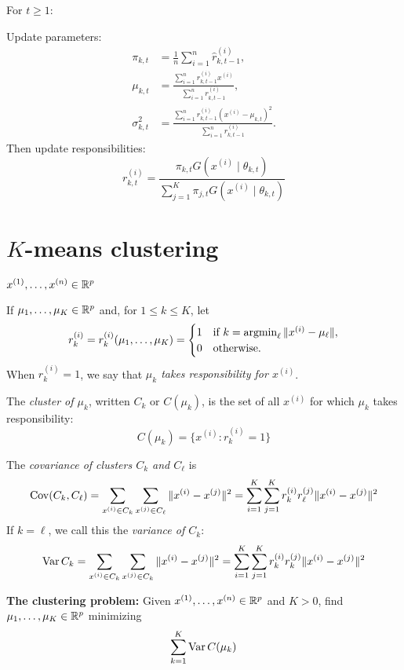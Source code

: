 \documentclass[12pt]{amsart}
\begin{document}
For $t\geq 1$:

Update parameters:
\begin{align*}
    \pi_{k, t} &= \frac1n\sum_{i=1}^n \hat r_{k,t-1}^{(i)},\\
    \mu_{k, t} &= \frac{\sum_{i=1}^n r^{(i)}_{k, t-1} x^{(i)}}{\sum_{i=1}^n r^{(i)}_{k,t-1}},\\
    \sigma_{k, t}^2 &= \frac{\sum_{i=1}^n r^{(i)}_{k, t-1}(x^{(i)}-\mu_{k,t})^2}{\sum_{i=1}^n r^{(i)}_{k, t-1}}.
\end{align*}
Then update responsibilities:
\[
    r_{k,t}^{(i)} = \frac{\pi_{k,t} G(x^{(i)} \mid \theta_{k, t})}{\sum_{j=1}^K \pi_{j,t} G(x^{(i)}\mid\theta_{k, t})}
\]


\section{$K$-means clustering}

$x^{(1)},\ldots,x^{(n)}\in\mathbb{R}^p$

If $\mu_1,\ldots,\mu_K\in\mathbb{R}^p$ and, for $1\leq k\leq K$, let
\[
r_k^{(i)} = r_k^{(i)}(\mu_1,\ldots,\mu_K) = \begin{cases}
    1&\text{if $k = \operatorname{\mathop{\operatorname*{argmin}}}_\ell \|x^{(i)} - \mu_\ell\|$},\\
    0&\text{otherwise.}
\end{cases}
\]
When $r_k^{(i)}=1$, we say that \emph{$\mu_k$ takes responsibility for $x^{(i)}$}.

The \emph{cluster of $\mu_k$}, written $C_k$ or $C(\mu_k)$,
is the set of all $x^{(i)}$ for which $\mu_k$ takes responsibility:
\[
    C(\mu_k) = \{x^{(i)} : r_k^{(i)}=1\}
\]

The \emph{covariance of clusters $C_k$ and $C_\ell$} is
\[
    \operatorname{Cov}(C_k, C_\ell) = \sum_{x^{(i)}\in C_k}\sum_{x^{(j)}\in C_\ell}\|x^{(i)} - x^{(j)}\|^2
    = \sum_{i=1}^K\sum_{j=1}^Kr_k^{(i)}r_\ell^{(j)}\|x^{(i)} - x^{(j)}\|^2
\]
If $k=\ell$, we call this the \emph{variance of $C_k$}:
\[
    \operatorname{Var} C_k = \sum_{x^{(i)}\in C_k}\sum_{x^{(j)}\in C_k}\|x^{(i)} - x^{(j)}\|^2
    = \sum_{i=1}^K\sum_{j=1}^Kr_k^{(i)}r_k^{(j)}\|x^{(i)} - x^{(j)}\|^2
\]

\textbf{The clustering problem:} Given $x^{(1)},\ldots,x^{(n)}\in\mathbb{R}^p$ and $K>0$,
find $\mu_1,\ldots,\mu_K\in\mathbb{R}^p$ minimizing
\[
    \sum_{k=1}^K \operatorname{Var} C(\mu_k)
\]
\end{document}
